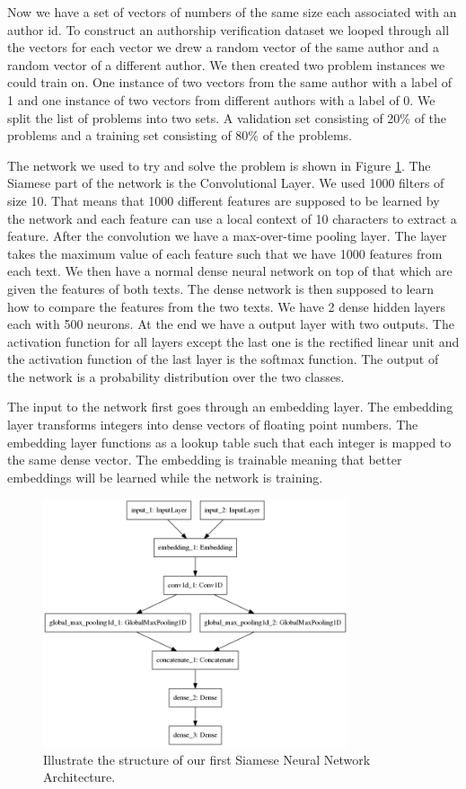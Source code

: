 Now we have a set of vectors of numbers of the same size each associated with an
author id. To construct an authorship verification dataset we looped through all
the vectors for each vector we drew a random vector of the same author and a
random vector of a different author. We then created two problem instances we
could train on. One instance of two vectors from the same author with a label of
1 and one instance of two vectors from different authors with a label of 0. We
split the list of problems into two sets. A validation set consisting of 20\% of
the problems and a training set consisting of 80\% of the problems.

The network we used to try and solve the problem is shown in Figure
\ref{fig:network_1}. The Siamese part of the network is the Convolutional
Layer. We used 1000 filters of size 10. That means that 1000 different features
are supposed to be learned by the network and each feature can use a local
context of 10 characters to extract a feature. After the convolution we have a
max-over-time pooling layer. The layer takes the maximum value of each feature
such that we have 1000 features from each text. We then have a normal dense
neural network on top of that which are given the features of both texts. The
dense network is then supposed to learn how to compare the features from the two
texts. We have 2 dense hidden layers each with 500 neurons. At the end we have
a output layer with two outputs. The activation function for all layers except
the last one is the rectified linear unit and the activation function of the
last layer is the softmax function. The output of the network is a probability
distribution over the two classes.

The input to the network first goes through an embedding layer. The embedding
layer transforms integers into dense vectors of floating point numbers. The
embedding layer functions as a lookup table such that each integer is mapped
to the same dense vector. The embedding is trainable meaning that better
embeddings will be learned while the network is training.

\begin{figure}[htb]
    \centering
    \includegraphics[width=0.8\textwidth]{./graphs/method/network1.png}
    \caption{Illustrate the structure of our first Siamese Neural Network
        Architecture.}
    \label{fig:network_1}
\end{figure}

